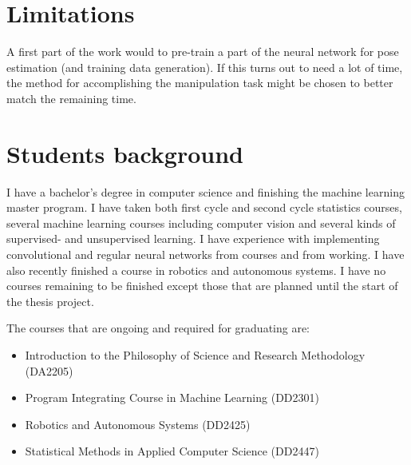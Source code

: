 \section{Limitations}

A first part of the work would to pre-train a part of the neural network for
pose estimation (and training data generation). If this turns out to need
a lot of time, the method for accomplishing the manipulation task might be
chosen to better match the remaining time.


\section{Students background}

I have a bachelor's degree in computer science and finishing the machine
learning master program. I have taken both first cycle and second cycle
statistics courses, several machine learning courses including computer vision
and several kinds of supervised- and unsupervised learning. I have experience
with implementing convolutional and regular neural networks from courses and
from working. I have also recently finished a course in robotics and autonomous
systems. I have no courses remaining to be finished except those that are
planned until the start of the thesis project.

The courses that are ongoing and required for graduating are:
\begin{itemize}
    \item Introduction to the Philosophy of Science and Research Methodology (DA2205)
    \item Program Integrating Course in Machine Learning (DD2301)
    \item Robotics and Autonomous Systems (DD2425)
    \item Statistical Methods in Applied Computer Science (DD2447)
\end{itemize}
